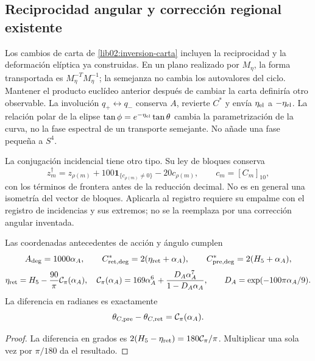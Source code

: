 \subsection{Reciprocidad angular y corrección regional existente}
\label{lib02:correccion-regional}

Los cambios de carta de \cref{lib02:inversion-carta} incluyen la
reciprocidad y la deformación elíptica ya construidas. En un plano
realizado por \(M_\eta\), la forma transportada es
\(M_\eta^{-T}M_\eta^{-1}\); la semejanza no cambia los
autovalores del ciclo. Mantener el producto euclídeo anterior después de
cambiar la carta definiría otro observable. La involución
\(q_+\leftrightarrow q_-\) conserva \(A\), revierte \(C^*\)
y envía \(\eta_{\rm el}\) a \(-\eta_{\rm el}\). La relación
polar de la elipse
\(\tan\phi=e^{-\eta_{\rm el}}\tan\theta\) cambia la
parametrización de la curva, no la fase espectral de un transporte
semejante. No añade una fase pequeña a \(S^4\).

La conjugación incidencial tiene otro tipo. Su ley de bloques conserva
\[
 z_m^\dagger=z_{\rho(m)}
 +100\mathbf1_{\{c_{\rho(m)}\ne0\}}-20c_{\rho(m)},
 \qquad c_m=[C_m]_{10},
\]
con los términos de frontera antes de la reducción decimal. No es en
general una isometría del vector de bloques. Aplicarla al registro
requiere su empalme con el registro de incidencias y sus extremos; no se la
reemplaza por una corrección angular inventada.

\begin{proposition}
\label{lib02:retorno-regional}
Las coordenadas antecedentes de acción y ángulo cumplen
\[
 A_{\rm deg}=1000\alpha_A,\qquad
 C^*_{\rm ret,deg}=2(\eta_{\rm ret}+\alpha_A),\qquad
 C^*_{\rm pre,deg}=2(H_5+\alpha_A),
\]
\[
 \eta_{\rm ret}=H_5-\frac{90}{\pi}\mathcal C_\pi(\alpha_A),
 \quad
 \mathcal C_\pi(\alpha_A)=169\alpha_A^6+
 \frac{D_A\alpha_A^7}{1-D_A\alpha_A},\qquad
 D_A=\exp(-100\pi\alpha_A/9).
\]
La diferencia en radianes es exactamente
\[
 \theta_{C,\rm pre}-\theta_{C,\rm ret}=\mathcal C_\pi(\alpha_A).
\]
\end{proposition}
\begin{proof}
La diferencia en grados es
\(2(H_5-\eta_{\rm ret})=180\mathcal C_\pi/\pi\).
Multiplicar una sola vez por \(\pi/180\) da el resultado.
\end{proof}

